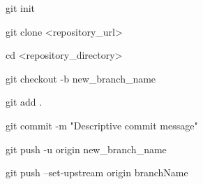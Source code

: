 git init 

git clone <repository_url>

cd <repository_directory>

git checkout -b new_branch_name

git add .

git commit -m "Descriptive commit message"

git push -u origin new_branch_name

git push --set-upstream origin branchName